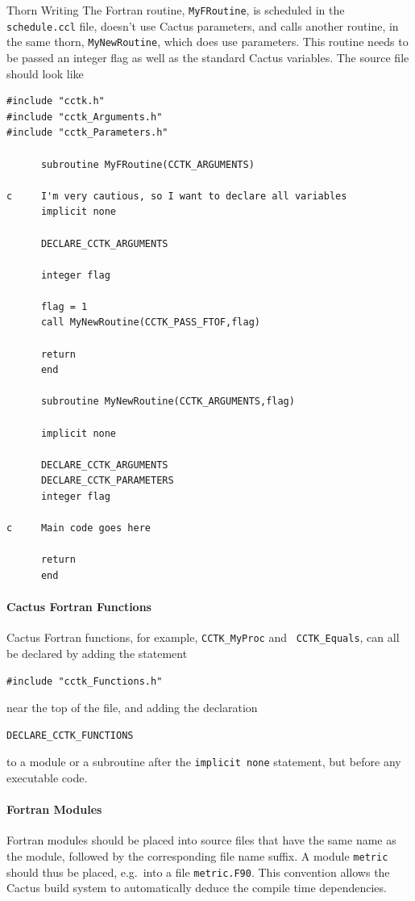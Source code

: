 \begin{cactuspart}{Thorn Writing}
The Fortran routine, \verb|MyFRoutine|, is scheduled in the {\tt
schedule.ccl} file, doesn't use Cactus parameters, and calls another
routine, in the same thorn, \verb|MyNewRoutine|, which does use
parameters.  This routine needs to be passed an integer flag as well
as the standard Cactus variables. The source file should look like
%
\begin{verbatim}
#include "cctk.h"
#include "cctk_Arguments.h"
#include "cctk_Parameters.h"

      subroutine MyFRoutine(CCTK_ARGUMENTS)

c     I'm very cautious, so I want to declare all variables
      implicit none

      DECLARE_CCTK_ARGUMENTS

      integer flag

      flag = 1
      call MyNewRoutine(CCTK_PASS_FTOF,flag)

      return
      end

      subroutine MyNewRoutine(CCTK_ARGUMENTS,flag)

      implicit none

      DECLARE_CCTK_ARGUMENTS
      DECLARE_CCTK_PARAMETERS
      integer flag

c     Main code goes here

      return
      end

\end{verbatim}

\paragraph{Cactus Fortran Functions}

Cactus Fortran functions, for example, \texttt{CCTK\_MyProc} and {\tt
CCTK\_Equals}, can all be declared by adding the statement
%
\begin{verbatim}
#include "cctk_Functions.h"
\end{verbatim}
%
near the top of the file, and adding the declaration
%
\begin{verbatim}
DECLARE_CCTK_FUNCTIONS
\end{verbatim}
%
to a module or a subroutine after the \texttt{implicit none}
statement, but before any executable code.

\paragraph{Fortran Modules}

Fortran modules should be placed into source files that have the same
name as the module, followed by the corresponding file name suffix.  A
module \texttt{metric} should thus be placed, e.g.\ into a file
\texttt{metric.F90}.  This convention allows the Cactus build system
to automatically deduce the compile time dependencies.


\end{cactuspart}
